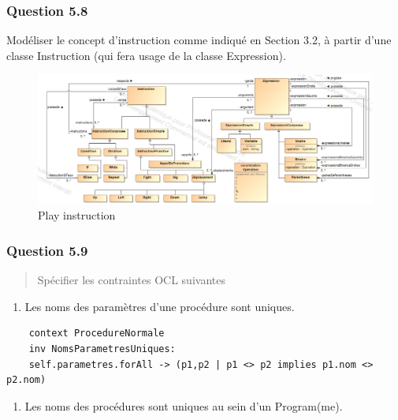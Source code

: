 \documentclass[]{article}
\providecommand{\tightlist}{%
  \setlength{\itemsep}{0pt}\setlength{\parskip}{0pt}}
\begin{document}
\hypertarget{question-5.8}{%
\subsubsection{Question 5.8}\label{question-5.8}}

Modéliser le concept d'instruction comme indiqué en Section 3.2, à
partir d'une classe Instruction (qui fera usage de la classe
Expression).

\begin{figure}
\centering
\includegraphics[angle=90, width=\textwidth, height=\textheight, keepaspectratio]{./images_final/PlayQ8.png}
\caption{Play instruction}
\end{figure}

\hypertarget{question-5.9}{%
\subsubsection{Question 5.9}\label{question-5.9}}

\begin{quote}
Spécifier les contraintes OCL suivantes
\end{quote}

\begin{enumerate}
\def\labelenumi{\arabic{enumi})}
\tightlist
\item
  Les noms des paramètres d'une procédure sont uniques.
\end{enumerate}

\begin{verbatim}
    context ProcedureNormale
    inv NomsParametresUniques:
    self.parametres.forAll -> (p1,p2 | p1 <> p2 implies p1.nom <> p2.nom)
\end{verbatim}

\begin{enumerate}
\def\labelenumi{\arabic{enumi})}
\setcounter{enumi}{1}
\tightlist
\item
  Les noms des procédures sont uniques au sein d'un Program(me).
\end{enumerate}
\end{document}
